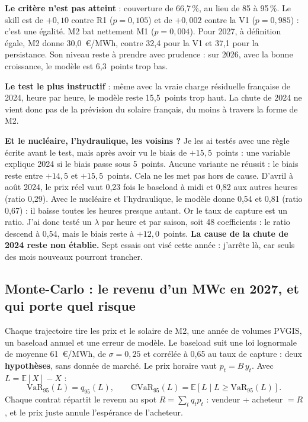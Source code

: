 \documentclass[11pt,a4paper]{article}
\begin{document}
\begin{attention}
\textbf{Le critère n'est pas atteint} : couverture de 66,7\,\%, au lieu de 85 à 95\,\%. Le skill est de $+0{,}10$ contre R1 ($p = 0{,}105$) et de $+0{,}002$ contre la V1 ($p = 0{,}985$) : c'est une égalité. M2 bat nettement M1 ($p = 0{,}004$). Pour 2027, à définition égale, M2 donne 30,0~€/MWh, contre 32,4 pour la V1 et 37,1 pour la persistance. Son niveau reste à prendre avec prudence : sur 2026, avec la bonne croissance, le modèle est 6,3~points trop bas.
\end{attention}

\begin{aretenir}
\textbf{Le test le plus instructif} : même avec la vraie charge résiduelle française de 2024, heure par heure, le modèle reste 15,5~points trop haut. La chute de 2024 ne vient donc pas de la prévision du solaire français, du moins à travers la forme de M2.
\end{aretenir}

\textbf{Et le nucléaire, l'hydraulique, les voisins ?} Je les ai testés avec une règle écrite avant le test, mais après avoir vu le biais de $+15{,}5$~points : une variable explique 2024 si le biais passe sous 5~points. Aucune variante ne réussit : le biais reste entre $+14{,}5$ et $+15{,}5$~points. Cela ne les met pas hors de cause. D'avril à août 2024, le prix réel vaut 0,23 fois le baseload à midi et 0,82 aux autres heures (ratio 0,29). Avec le nucléaire et l'hydraulique, le modèle donne 0,54 et 0,81 (ratio 0,67) : il baisse toutes les heures presque autant. Or le taux de capture est un ratio. J'ai donc testé un $\lambda$ par heure et par saison, soit 48 coefficients : le ratio descend à 0,54, mais le biais reste à $+12{,}0$~points. \textbf{La cause de la chute de 2024 reste non établie.} Sept essais ont visé cette année : j'arrête là, car seuls des mois nouveaux pourront trancher.


\subsection{Monte-Carlo : le revenu d'un MWc en 2027, et qui porte quel risque}

Chaque trajectoire tire les prix et le solaire de M2, une année de volumes PVGIS, un baseload annuel et une erreur de modèle. Le baseload suit une loi lognormale de moyenne 61~€/MWh, de $\sigma = 0{,}25$ et corrélée à 0,65 au taux de capture : deux \textbf{hypothèses}, sans donnée de marché. Le prix horaire vaut $p_t = B\,y_t$. Avec $L = \mathbb{E}[X] - X$ :
\[
\mathrm{VaR}_{95}(L) = q_{95}(L),
\qquad
\mathrm{CVaR}_{95}(L) = \mathbb{E}[L \mid L \ge \mathrm{VaR}_{95}(L)].
\]
Chaque contrat répartit le revenu au spot $R = \sum_t q_t p_t$ : vendeur + acheteur $= R$, et le prix juste annule l'espérance de l'acheteur.
\end{document}
